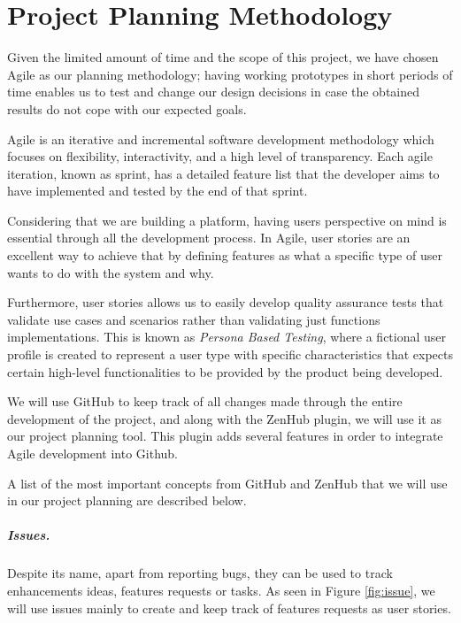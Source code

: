 \chapter{Project Planning Methodology}

Given the limited amount of time and the scope of this project, we have chosen Agile as our planning methodology; having working prototypes in short periods of time enables us to test and change our design decisions in case the obtained results do not cope with our expected goals.  

Agile is an iterative and incremental software development methodology which focuses on flexibility, interactivity, and a high level of transparency. Each agile iteration, known as sprint, has a detailed feature list that the developer aims to have implemented and tested by the end of that sprint.

Considering that we are building a platform, having users perspective on mind is essential through all the development process. In Agile, user stories are an excellent way to achieve that by defining features as what a specific type of user wants to do with the system and why. 

Furthermore, user stories allows us to easily develop quality assurance tests that validate use cases and scenarios rather than validating just functions implementations. This is known as \textit{Persona Based Testing}, where a fictional user profile is created to represent a user type with specific characteristics that expects certain high-level functionalities to be provided by the product being developed.

We will use GitHub \cite{github} to keep track of all changes made through the entire development of the project, and along with the ZenHub \cite{zenhub} plugin, we will use it as our project planning tool. This plugin adds several features in order to integrate Agile development into Github. 

A list of the most important concepts from GitHub and ZenHub that we will use in our project planning are described below.

\paragraph*{Issues.} Despite its name, apart from reporting bugs, they can be used to track enhancements ideas, features requests or tasks. As seen in Figure \ref{fig:issue}, we will use issues mainly to create and keep track of features requests as user stories. 

